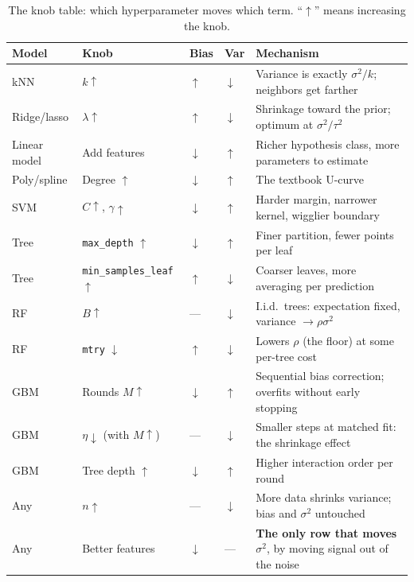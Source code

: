 \begin{table}[H]
\centering
\small
\caption{The knob table: which hyperparameter moves which term. ``$\uparrow$'' means increasing the knob.}
\label{cml:tab:bv_knobs}
\begin{tabularx}{\textwidth}{llllX}
\toprule
\textbf{Model} & \textbf{Knob} & \textbf{Bias} & \textbf{Var} & \textbf{Mechanism} \\
\midrule
kNN & $k \uparrow$ & $\uparrow$ & $\downarrow$ & Variance is exactly $\sigma^2/k$; neighbors get farther \\
Ridge/lasso & $\lambda \uparrow$ & $\uparrow$ & $\downarrow$ & Shrinkage toward the prior; optimum at $\sigma^2/\tau^2$ \\
Linear model & Add features & $\downarrow$ & $\uparrow$ & Richer hypothesis class, more parameters to estimate \\
Poly/spline & Degree $\uparrow$ & $\downarrow$ & $\uparrow$ & The textbook U-curve \\
SVM & $C \uparrow$, $\gamma \uparrow$ & $\downarrow$ & $\uparrow$ & Harder margin, narrower kernel, wigglier boundary \\
Tree & \texttt{max\_depth} $\uparrow$ & $\downarrow$ & $\uparrow$ & Finer partition, fewer points per leaf \\
Tree & \texttt{min\_samples\_leaf} $\uparrow$ & $\uparrow$ & $\downarrow$ & Coarser leaves, more averaging per prediction \\
RF & $B \uparrow$ & --- & $\downarrow$ & I.i.d.\ trees: expectation fixed, variance $\to \rho\sigma^2$ \\
RF & \texttt{mtry} $\downarrow$ & $\uparrow$ & $\downarrow$ & Lowers $\rho$ (the floor) at some per-tree cost \\
GBM & Rounds $M \uparrow$ & $\downarrow$ & $\uparrow$ & Sequential bias correction; overfits without early stopping \\
GBM & $\eta \downarrow$ (with $M \uparrow$) & --- & $\downarrow$ & Smaller steps at matched fit: the shrinkage effect \\
GBM & Tree depth $\uparrow$ & $\downarrow$ & $\uparrow$ & Higher interaction order per round \\
Any & $n \uparrow$ & --- & $\downarrow$ & More data shrinks variance; bias and $\sigma^2$ untouched \\
Any & Better features & $\downarrow$ & --- & \textbf{The only row that moves $\sigma^2$}, by moving signal out of the noise \\
\bottomrule
\end{tabularx}
\end{table}

